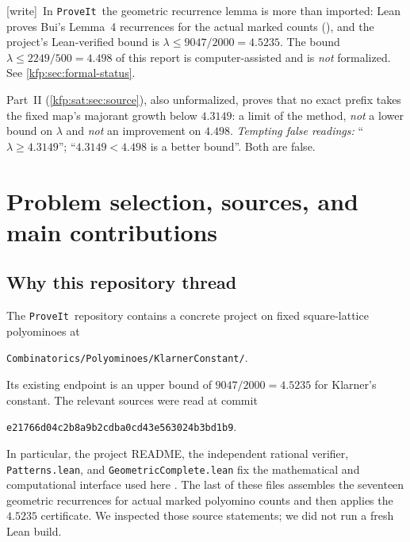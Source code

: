 \documentclass[11pt,a4paper]{article}
\theoremstyle{definition}
\theoremstyle{remark}
\newcommand{\repo}{\texttt{ProveIt}}
\newcommand{\sha}{\texttt{e21766d04c2b8a9b2cdba0cd43e563024b3bd1b9}}
\newcommand{\wtag}{\textsf{\small[write]}}
\begin{document}
\begin{titlepage}
\begin{resultbox}
\smallskip
\wtag\ In \repo\ the geometric recurrence lemma is more than imported: Lean
proves Bui's Lemma~4 recurrences for the actual marked counts
(), and the project's Lean-verified
bound is $\lambda\leq 9047/2000=4.5235$. The bound $\lambda\leq 2249/500=4.498$
of this report is computer-assisted and is \emph{not} formalized. See
\cref{kfp:sec:formal-status}.

 Part~II (\cref{kfp:sat:sec:source}),
also unformalized, proves that no exact prefix takes the fixed map's
majorant growth below $4.3149$: a limit of the method, \emph{not} a lower
bound on $\lambda$ and \emph{not} an improvement on $4.498$.
\emph{Tempting false readings:} ``$\lambda\geq4.3149$''; ``$4.3149<4.498$ is
a better bound''. Both are false.
\end{resultbox}
\end{titlepage}

\hypersetup{pageanchor=true}
{\small\setlength{\parskip}{0pt}\tableofcontents}
\clearpage
{}

\section{Problem selection, sources, and main contributions}
\label{kfp:sec:scope}

\subsection{Why this repository thread}
The \repo\ repository contains a concrete project on fixed square-lattice
polyominoes at
\begin{center}\small
\texttt{Combinatorics/Polyominoes/KlarnerConstant/}.
\end{center}
Its existing endpoint is an upper bound of $9047/2000=4.5235$ for Klarner's
constant. The relevant sources were read at commit
\begin{center}\small\sha.\end{center}
In particular, the project README, the independent rational verifier,
\texttt{Patterns.lean}, and \texttt{GeometricComplete.lean} fix the mathematical
and computational interface used here \cite{repo,reporeadme,repocert,repopatterns,repocomplete}.
The last of these files assembles the seventeen geometric recurrences for
actual marked polyomino counts and then applies the $4.5235$ certificate.
We inspected those source statements; we did not run a fresh Lean build.
\end{document}
